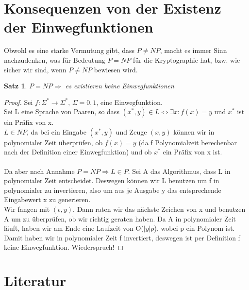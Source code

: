 \documentclass[12pt,a4paper]{article}
\newtheorem{theorem}{Satz}[section]
\theoremstyle{definition}
\begin{document}
    \section{Konsequenzen von der Existenz der Einwegfunktionen}

    Obwohl es eine starke Vermutung gibt, dass $P \not = NP$, macht es immer Sinn nachzudenken, was für Bedeutung
    $P = NP$ für die Kryptographie hat, bzw. wie sicher wir sind, wenn $P \not = NP$ bewiesen wird.

    \begin{theorem}
        $P = NP \Rightarrow$ es existieren keine Einwegfunktionen
    \end{theorem}

    \begin{proof}
        Sei $f: \Sigma^* \longrightarrow \Sigma^*$, $\Sigma = {0, 1}$, eine Einwegfunktion. \\
        Sei L eine Sprache von Paaren, so dass $(x^*, y) \in L \Leftrightarrow \exists x: f(x) = y$ und $x^*$ ist ein
        Präfix von x. \\
        $L \in NP$, da bei ein Eingabe $(x^*, y)$ und Zeuge $(x, y)$ können wir in polynomialer Zeit überprüfen,
        ob $f(x) = y$ (da f Polynomialzeit berechenbar nach der Definition einer Einwegfunktion) und ob $x^*$ ein
        Präfix von x ist. \\ \\

        Da aber nach Annahme $P = NP \Rightarrow L \in P$. Sei A das Algorithmus, dass L in polynomialer Zeit
        entscheidet. Deswegen können wir L benutzen um f in polynomialer
        zu invertieren, also um aus je Ausgabe y das entsprechende Eingabewert x zu generieren. \\
        Wir fangen mit $(\epsilon, y)$. Dann raten wir das nächste Zeichen von x und benutzen A um zu überprüfen,
        ob wir richtig geraten haben. Da A in polynomialer Zeit läuft, haben wir am Ende eine Laufzeit von O($|y|p$),
        wobei p ein Polynom ist. Damit haben wir in polynomialer Zeit f invertiert, deswegen ist per Definition
        f keine Einwegfunktion. Wiederspruch!
    \end{proof}

    \section{Literatur}
\end{document}
